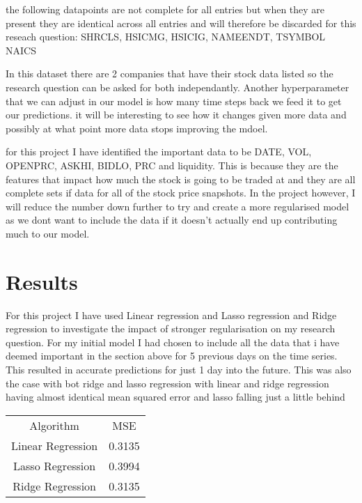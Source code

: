 \documentclass{report}
\begin{document}
the following datapoints are not complete for all entries but when they are present they are identical across all entries and will therefore be discarded for this reseach question: SHRCLS, HSICMG, HSICIG, NAMEENDT, TSYMBOL NAICS

In this dataset there are 2 companies that have their stock data listed so the research question can be asked for both independantly. Another hyperparameter that we can adjust in our model is how many time steps back we feed it to get our predictions. it will be interesting to see how it changes given more data and possibly at what point more data stops improving the mdoel.


for this project I have identified the important data to be DATE, VOL, OPENPRC, ASKHI, BIDLO, PRC and liquidity. This is because they are the features that impact how much the stock is going to be traded at and they are all complete sets if data for all of the stock price snapshots. In the project however, I will reduce the number down further to try and create a more regularised model as we dont want to include the data if it doesn't actually end up contributing much to our model.

\section{Results}

For this project I have used Linear regression and Lasso regression and Ridge regression to investigate the impact of stronger regularisation on my research question.
For my initial model I had chosen to include all the data that i have deemed important in the section above for 5 previous days on the time series. This resulted in accurate predictions for just 1 day into the future. This was also the case with bot ridge and lasso regression with linear and ridge regression having almost identical mean squared error and lasso falling just a little behind

\begin{minipage} {\linewidth}
\bigskip
\centering
{}
\begin{tabular}{c c}
    Algorithm & MSE \\
    Linear Regression & 0.3135 \\
    Lasso Regression & 0.3994 \\
    Ridge Regression & 0.3135
\end{tabular}
\bigskip
\end{minipage}
\end{document}
